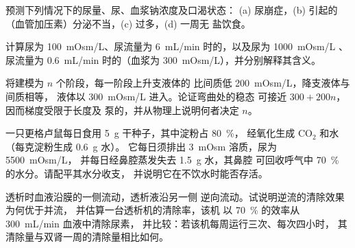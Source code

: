\begin{exercise}[$\star\star$]\label{exo:b3:renal-osmoregulation:8}
预测下列情况下的尿量、尿、血浆钠浓度及口渴状态：
(a) 尿崩症，(b) 引起的
（血管加压素）分泌不当，(c) 过多，(d) 一周无
盐饮食。
\end{exercise}

\begin{exercise}[$\star\star$]\label{exo:b3:renal-osmoregulation:9}
计算尿为 \qty{100}{mOsm/L}、尿流量为
\qty{6}{mL/min} 时的，以及尿为 \qty{1000}{mOsm/L}
、尿流量为 \qty{0.6}{mL/min} 时的（血浆为 \qty{300}{mOsm/L}），并分别解释其含义。
\end{exercise}

\begin{exercise}[$\star\star\star$]\label{exo:b3:renal-osmoregulation:10}
将建模为 $n$ 个阶段，每一阶段上升支液体的
比间质低 \qty{200}{mOsm/L}，降支液体与间质相等，
液体以 \qty{300}{mOsm/L} 进入。论证弯曲处的稳态
可接近 $300 +
200n$，因而梯度受限于长度及
泵的，并从物理上说明何者决定 $n$。
\end{exercise}

\begin{exercise}[$\star\star\star$]\label{exo:b3:renal-osmoregulation:11}
一只更格卢鼠每日食用 \qty{5}{g} 干种子，其中淀粉占 \qty{80}{\%}，
经氧化生成 CO$_{2}$ 和水（每克淀粉生成 \qty{0.6}{g} 水）。
它每日须排出 \qty{3}{mOsm} 溶质，尿为 \qty{5500}{mOsm/L}，
并每日经鼻腔蒸发失去 \qty{1.5}{g} 水，其鼻腔
可回收呼气中 \qty{70}{\%} 的水分。请配平其水分收支，
并说明它在不饮水时能否存活。
\end{exercise}

\begin{exercise}[$\star\star\star$]\label{exo:b3:renal-osmoregulation:12}
透析时血液沿膜的一侧流动，透析液沿另一侧
逆向流动。试说明逆流的清除效果为何优于并流，
并估算一台透析机的清除率，该机
以 \qty{70}{\%} 的效率从 \qty{300}{mL/min} 血液中清除尿素，
并比较：若该机每周运行三次、每次四小时，
其清除量与双肾一周的清除量相比如何。
\end{exercise}

